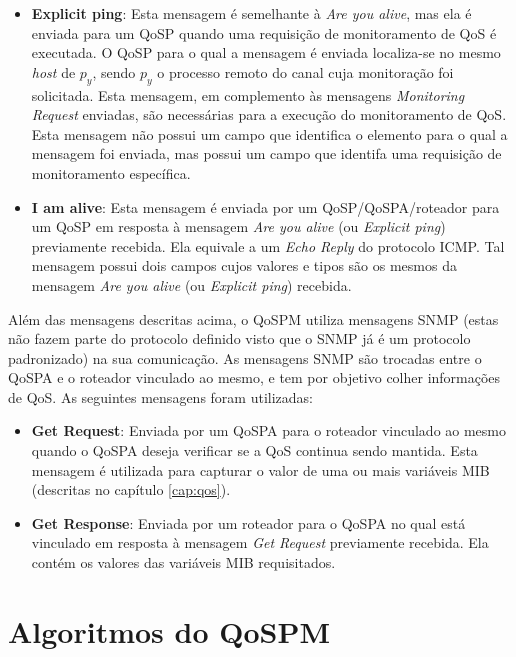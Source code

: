 \begin{itemize}
\item \textbf{Explicit ping}: Esta mensagem é semelhante à \textit{Are you alive}, mas ela é enviada para um QoSP quando uma requisição de monitoramento de QoS é executada. O QoSP para o qual a mensagem é enviada localiza-se no mesmo \textit{host} de $p_{y}$, sendo $p_{y}$ o processo remoto do canal cuja monitoração foi solicitada. Esta mensagem, em complemento às mensagens \textit{Monitoring Request} enviadas, são necessárias para a execução do monitoramento de QoS. Esta mensagem não possui um campo que identifica o elemento para o qual a mensagem foi enviada, mas possui um campo que identifa uma requisição de monitoramento específica. 

\item \textbf{I am alive}: Esta mensagem é enviada por um QoSP/QoSPA/roteador para um QoSP em resposta à mensagem \textit{Are you alive} (ou \textit{Explicit ping}) previamente recebida. Ela equivale a um \textit{Echo Reply} do protocolo ICMP. Tal mensagem possui dois campos cujos valores e tipos são os mesmos da mensagem \textit{Are you alive} (ou \textit{Explicit ping}) recebida.
\end{itemize}

	Além das mensagens descritas acima, o QoSPM utiliza mensagens SNMP (estas não fazem parte do protocolo definido visto que o SNMP já é um protocolo padronizado) na sua comunicação. As mensagens SNMP são trocadas entre o QoSPA e o roteador vinculado ao mesmo, e tem por objetivo colher informações de QoS. As seguintes mensagens foram utilizadas:
	
\begin{itemize}
\item \textbf{Get Request}: Enviada por um QoSPA para o roteador vinculado ao mesmo quando o QoSPA deseja verificar se a QoS continua sendo mantida. Esta mensagem é utilizada para capturar o valor de uma ou mais variáveis MIB (descritas no capítulo \ref{cap:qos}).

\item \textbf{Get Response}: Enviada por um roteador para o QoSPA no qual está vinculado em resposta à mensagem \textit{Get Request} previamente recebida. Ela contém os valores das variáveis MIB requisitados.
\end{itemize}	

\section{Algoritmos do QoSPM}

